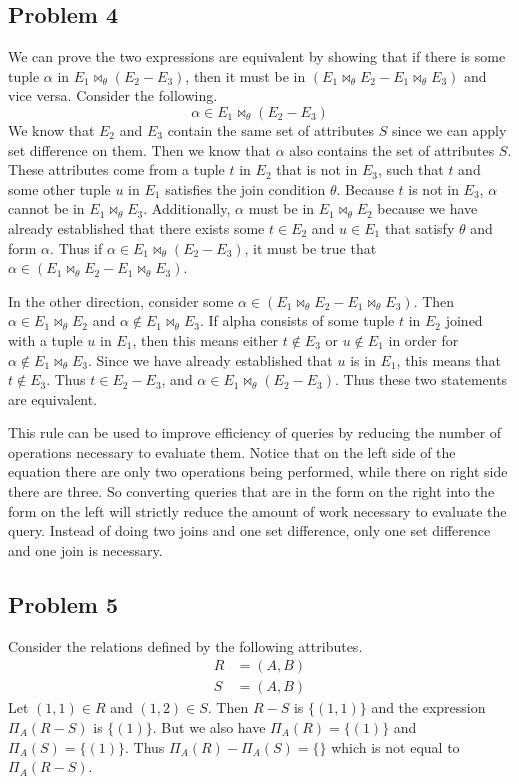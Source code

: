 \documentclass[12pt]{article}
\begin{document}
\subsection*{Problem 4}

We can prove the two expressions are equivalent by showing that if there is some tuple \(\alpha\) in \(E_1 \bowtie_\theta (E_2-E_3)\),
then it must be in \((E_1\bowtie_\theta E_2 - E_1 \bowtie_\theta E_3)\) and vice versa. Consider the following.
\[\alpha \in E_1 \bowtie_\theta (E_2-E_3)\]
We know that \(E_2\) and \(E_3\) contain the same set of attributes \(S\) since we can apply set difference on them. Then we know that \(\alpha\) also
contains the set of attributes \(S\). These attributes come from a tuple \(t\) in \(E_2\) that is not in \(E_3\), such that \(t\) and some other tuple \(u\)
in \(E_1\) satisfies the join condition \(\theta\). Because \(t\) is not in \(E_3\), \(\alpha\) cannot be in \(E_1\bowtie_\theta E_3\). Additionally, \(\alpha\)
must be in \(E_1\bowtie_\theta E_2\) because we have already established that there exists some \(t\in E_2\) and \(u\in E_1\) that satisfy \(\theta\) and form \(\alpha\).
Thus if \(\alpha\in E_1 \bowtie_\theta (E_2-E_3)\), it must be true that \(\alpha\in (E_1\bowtie_\theta E_2 - E_1 \bowtie_\theta E_3)\).

In the other direction, consider some \(\alpha\in (E_1\bowtie_\theta E_2 - E_1 \bowtie_\theta E_3)\). Then \(\alpha\in E_1\bowtie_\theta E_2\) and
\(\alpha\notin E_1\bowtie_\theta E_3\). If alpha consists of some tuple \(t\) in \(E_2\) joined with a tuple \(u\) in \(E_1\), then this means either
\(t\notin E_3\) or \(u\notin E_1\) in order for \(\alpha\notin E_1\bowtie_\theta E_3\). Since we have already established that \(u\) is in \(E_1\), this means
that \(t\notin E_3\). Thus \(t\in E_2-E_3\), and \(\alpha \in E_1 \bowtie_\theta (E_2-E_3)\). Thus these two statements are equivalent.

This rule can be used to improve efficiency of queries by reducing the number of operations necessary to evaluate them. Notice that on the left side of the equation there
are only two operations being performed, while there on right side there are three. So converting queries that are in the form on the right into the form
on the left will strictly reduce the amount of work necessary to evaluate the query. Instead of doing two joins and one set difference, only one set difference and
one join is necessary.

\subsection*{Problem 5}

Consider the relations defined by the following attributes.
\begin{align*}
        R &= (A,B)\\
        S &= (A,B)
\end{align*}
Let \((1,1)\in R\) and \((1,2)\in S\). Then \(R-S\) is \(\{(1,1)\}\) and the expression \(\Pi_A(R-S)\) is \(\{(1)\}\). But we also have
\(\Pi_A(R) = \{(1)\}\) and \(\Pi_A(S) = \{(1)\}\). Thus \(\Pi_A(R) - \Pi_A(S) = \{\}\) which is not equal to \(\Pi_A(R-S)\).
\end{document}
